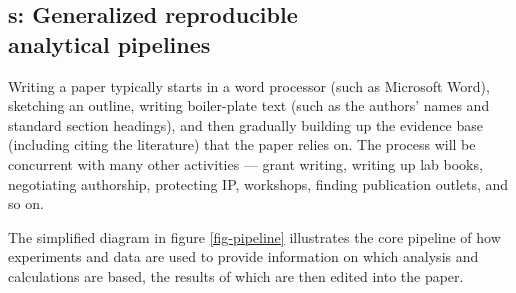 \documentclass{comjnl}
\begin{document}
\begin{change}
\subsection{\RAPstar s: Generalized reproducible \\ analytical pipelines}\label{RAP-section}
Writing a paper typically starts in a word processor (such as Microsoft Word), sketching an outline, writing boiler-plate text (such as the authors' names and standard section headings), and then gradually building up the evidence base (including citing the literature) that the paper relies on. The process will be concurrent with many other activities --- grant writing, writing up lab books, negotiating authorship, protecting IP, workshops, finding publication outlets, and so on.

The simplified diagram in figure \ref{fig-pipeline} illustrates the core pipeline of how experiments and data are used to provide information on which analysis and calculations are based, the results of which are then edited into the paper.

\begin{figure*}[t]
\begin{center}
\def\drop#1{\setbox0=\hbox{\lower .5em\hbox{#1}}%
\ht0=0em
\dp0=0em
\copy0}
\def\lowarrow{\drop{$\rightarrow$}}


\end{center}
\end{figure*}
\end{change}
\end{document}
